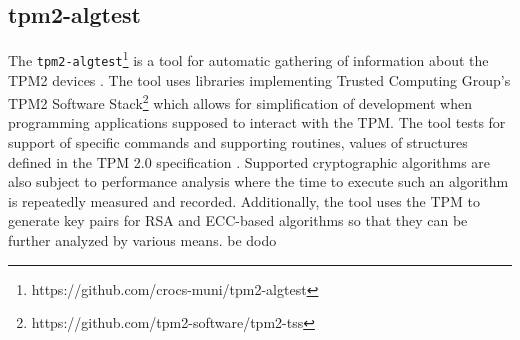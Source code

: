 \subsection{tpm2-algtest}
The \texttt{tpm2-algtest}\footnote{https://github.com/crocs-muni/tpm2-algtest} is a tool for automatic gathering of information about the TPM2 devices \cite{Struk2019thesis}. The tool uses libraries implementing Trusted Computing Group's TPM2 Software Stack\footnote{https://github.com/tpm2-software/tpm2-tss} which allows for simplification of development when programming applications supposed to interact with the TPM. The tool tests for support of specific commands and supporting routines, values of structures defined in the TPM 2.0 specification \cite{tcg_p3_commands, tcg_p4_supproutines, tcg_p2_structures}. Supported cryptographic algorithms are also subject to performance analysis where the time to execute such an algorithm is repeatedly measured and recorded. Additionally, the tool uses the TPM to generate key pairs for RSA and ECC-based algorithms so that they can be further analyzed by various means.
be dodo